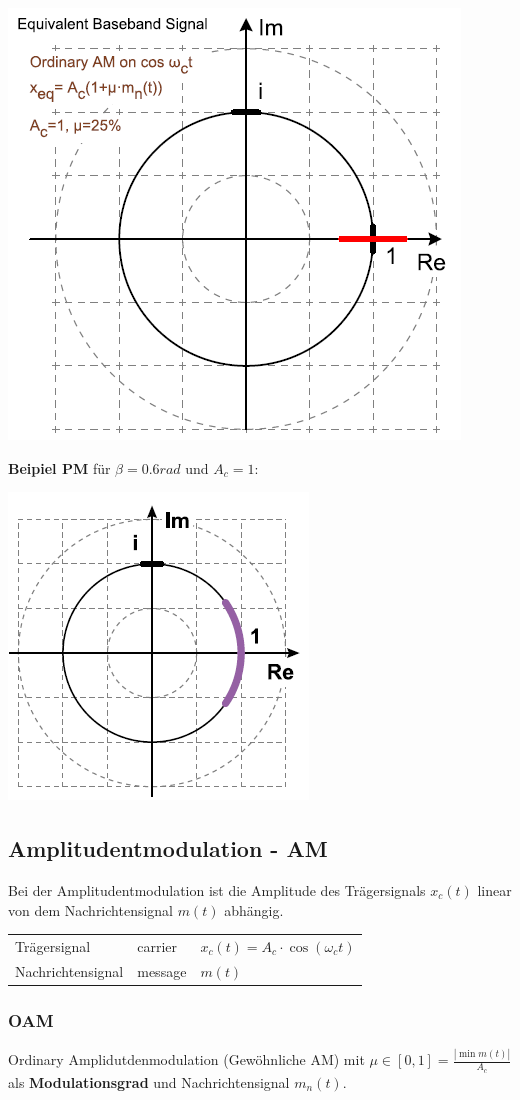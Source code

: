 \begin{center}
	\includegraphics[width=0.5\columnwidth]{Images/orinary_am_eq}
\end{center}


\noindent\textbf{Beipiel PM} für $\beta = 0.6rad$ und $A_c = 1$:
\begin{center}
	\includegraphics[width=0.5\columnwidth]{Images/phim_eq}
\end{center}

\subsection{Amplitudentmodulation - AM}\label{AM}
Bei der Amplitudentmodulation ist die Amplitude des Trägersignals $x_c(t)$ linear von dem Nachrichtensignal $m(t)$ abhängig.

\begin{tabular}{lll}
	Trägersignal & carrier & $x_c(t) = A_c \cdot \cos(\omega_ct)$ \\
	Nachrichtensignal & message & $m(t)$ \\
\end{tabular}


\subsubsection{OAM}
Ordinary Amplidutdenmodulation (Gewöhnliche AM) mit $\mu \in [0, 1] = \frac{\left|\min m(t)\right|}{A_c}$ als \textbf{Modulationsgrad} und Nachrichtensignal $m_n(t)$. 

